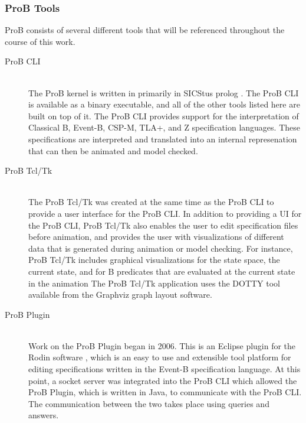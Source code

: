 \subsubsection{ProB Tools}

ProB consists of several different tools that will be referenced throughout the course of this work. 

\begin{description}

	\item[ProB CLI] \hfill \\ 
	The ProB kernel is written in primarily in SICStus prolog \cite{LeBu08_225}. The ProB CLI is available as a binary executable, and all of the other tools listed here are built on top of it. The ProB CLI provides support for the interpretation of Classical B, Event-B, CSP-M, TLA+, and Z specification languages. These specifications are interpreted and translated into an internal represenation that can then be animated and model checked.

	\item[ProB Tcl/Tk] \hfill \\
	The ProB Tcl/Tk was created at the same time as the ProB CLI to provide a user interface for the ProB CLI. In addition to providing a UI for the ProB CLI, ProB Tcl/Tk also enables the user to edit specification files before animation, and provides the user with visualizations of different data that is generated during animation or model checking. For instance, ProB Tcl/Tk includes graphical visualizations for the state space, the current state, and for B predicates that are evaluated at the current state in the animation \cite{LeSaBeLu08_228} The ProB Tcl/Tk application uses the DOTTY tool available from the Graphviz graph layout software.

	\item[ProB Plugin] \hfill \\
	Work on the ProB Plugin began in 2006. This is an Eclipse plugin for the Rodin software \cite{BuHa07_292}, which is an easy to use and extensible tool platform for editing specifications written in the Event-B specification language. At this point, a socket server was integrated into the ProB CLI which allowed the ProB Plugin, which is written in Java, to communicate with the ProB CLI. The communication between the two takes place using queries and answers.


\end{description}

